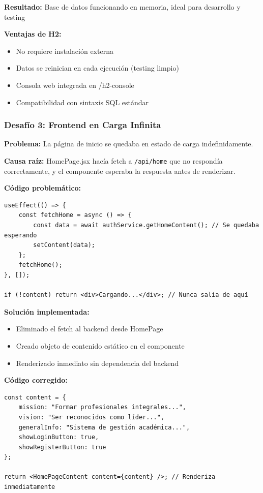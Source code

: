 \documentclass[11pt,a4paper]{article}
\begin{document}
\textbf{Resultado:} Base de datos funcionando en memoria, ideal para desarrollo y testing

\textbf{Ventajas de H2:}
\begin{itemize}
    \item No requiere instalación externa
    \item Datos se reinician en cada ejecución (testing limpio)
    \item Consola web integrada en /h2-console
    \item Compatibilidad con sintaxis SQL estándar
\end{itemize}

\subsubsection{Desafío 3: Frontend en Carga Infinita}

\textbf{Problema:} La página de inicio se quedaba en estado de carga indefinidamente.

\textbf{Causa raíz:} HomePage.jsx hacía fetch a \texttt{/api/home} que no respondía correctamente, y el componente esperaba la respuesta antes de renderizar.

\textbf{Código problemático:}
\begin{verbatim}
useEffect(() => {
    const fetchHome = async () => {
        const data = await authService.getHomeContent(); // Se quedaba esperando
        setContent(data);
    };
    fetchHome();
}, []);

if (!content) return <div>Cargando...</div>; // Nunca salía de aquí
\end{verbatim}

\textbf{Solución implementada:}
\begin{itemize}
    \item Eliminado el fetch al backend desde HomePage
    \item Creado objeto de contenido estático en el componente
    \item Renderizado inmediato sin dependencia del backend
\end{itemize}

\textbf{Código corregido:}
\begin{verbatim}
const content = {
    mission: "Formar profesionales integrales...",
    vision: "Ser reconocidos como líder...",
    generalInfo: "Sistema de gestión académica...",
    showLoginButton: true,
    showRegisterButton: true
};

return <HomePageContent content={content} />; // Renderiza inmediatamente
\end{verbatim}
\end{document}
